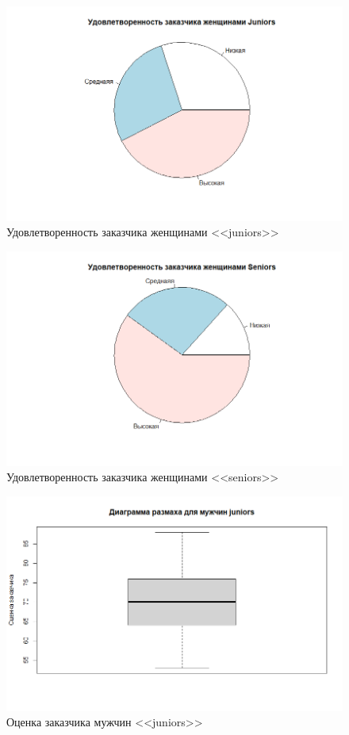 \begin{figure}[H]
	\centering
	\includegraphics[width=\linewidth]{figwj}
	\caption{Удовлетворенность заказчика женщинами <<juniors>>}
\end{figure}

\begin{figure}[H]
	\centering
	\includegraphics[width=\linewidth]{figws}
	\caption{Удовлетворенность заказчика женщинами <<seniors>>}
\end{figure}




\begin{figure}[H]
	\centering
	\includegraphics[width=\linewidth]{figboxmj}
	\caption{Оценка заказчика мужчин <<juniors>>}
\end{figure}

